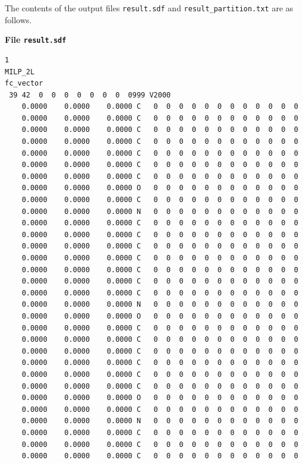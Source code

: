 \documentclass[11pt, titlepage, dvipdfmx, twoside]{article}
\begin{document}
The contents of the output files {\tt result.sdf} and
{\tt result\_partition.txt} are as follows.

\bigskip

\begin{oframed}
{\bf File {\tt result.sdf}}\\
\begin{verbatim}
1
MILP_2L
fc_vector
 39 42  0  0  0  0  0  0  0  0999 V2000 
    0.0000    0.0000    0.0000 C   0  0  0  0  0  0  0  0  0  0  0  0
    0.0000    0.0000    0.0000 C   0  0  0  0  0  0  0  0  0  0  0  0
    0.0000    0.0000    0.0000 C   0  0  0  0  0  0  0  0  0  0  0  0
    0.0000    0.0000    0.0000 C   0  0  0  0  0  0  0  0  0  0  0  0
    0.0000    0.0000    0.0000 C   0  0  0  0  0  0  0  0  0  0  0  0
    0.0000    0.0000    0.0000 C   0  0  0  0  0  0  0  0  0  0  0  0
    0.0000    0.0000    0.0000 C   0  0  0  0  0  0  0  0  0  0  0  0
    0.0000    0.0000    0.0000 O   0  0  0  0  0  0  0  0  0  0  0  0
    0.0000    0.0000    0.0000 C   0  0  0  0  0  0  0  0  0  0  0  0
    0.0000    0.0000    0.0000 N   0  0  0  0  0  0  0  0  0  0  0  0
    0.0000    0.0000    0.0000 C   0  0  0  0  0  0  0  0  0  0  0  0
    0.0000    0.0000    0.0000 C   0  0  0  0  0  0  0  0  0  0  0  0
    0.0000    0.0000    0.0000 C   0  0  0  0  0  0  0  0  0  0  0  0
    0.0000    0.0000    0.0000 C   0  0  0  0  0  0  0  0  0  0  0  0
    0.0000    0.0000    0.0000 C   0  0  0  0  0  0  0  0  0  0  0  0
    0.0000    0.0000    0.0000 C   0  0  0  0  0  0  0  0  0  0  0  0
    0.0000    0.0000    0.0000 C   0  0  0  0  0  0  0  0  0  0  0  0
    0.0000    0.0000    0.0000 N   0  0  0  0  0  0  0  0  0  0  0  0
    0.0000    0.0000    0.0000 O   0  0  0  0  0  0  0  0  0  0  0  0
    0.0000    0.0000    0.0000 C   0  0  0  0  0  0  0  0  0  0  0  0
    0.0000    0.0000    0.0000 C   0  0  0  0  0  0  0  0  0  0  0  0
    0.0000    0.0000    0.0000 C   0  0  0  0  0  0  0  0  0  0  0  0
    0.0000    0.0000    0.0000 C   0  0  0  0  0  0  0  0  0  0  0  0
    0.0000    0.0000    0.0000 C   0  0  0  0  0  0  0  0  0  0  0  0
    0.0000    0.0000    0.0000 C   0  0  0  0  0  0  0  0  0  0  0  0
    0.0000    0.0000    0.0000 O   0  0  0  0  0  0  0  0  0  0  0  0
    0.0000    0.0000    0.0000 C   0  0  0  0  0  0  0  0  0  0  0  0
    0.0000    0.0000    0.0000 N   0  0  0  0  0  0  0  0  0  0  0  0
    0.0000    0.0000    0.0000 C   0  0  0  0  0  0  0  0  0  0  0  0
    0.0000    0.0000    0.0000 C   0  0  0  0  0  0  0  0  0  0  0  0
    0.0000    0.0000    0.0000 C   0  0  0  0  0  0  0  0  0  0  0  0

\end{verbatim}
\end{oframed}
\end{document}
